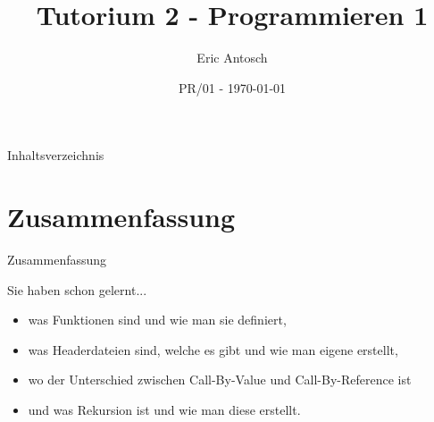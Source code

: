 \documentclass[usenames,dvipsnames,10pt]{beamer}
\title{Tutorium 2 - Programmieren 1}
\date[ISPN ’80]{PR/01 - \today}
\author{Eric Antosch}
\begin{document}
    
    \begin{frame}
        \titlepage
    \end{frame}    
    \begin{frame}{Inhaltsverzeichnis}
        \tableofcontents
    \end{frame}
    \section{Zusammenfassung}
    \begin{frame}{Zusammenfassung}
        \begin{block}{Sie haben schon gelernt...}
            \begin{itemize}
                \item was Funktionen sind und wie man sie definiert,
                \item was Headerdateien sind, welche es gibt und wie man eigene erstellt,
                \item wo der Unterschied zwischen Call-By-Value und Call-By-Reference ist
                \item und was Rekursion ist und wie man diese erstellt.
            \end{itemize}
        \end{block}
    \end{frame}
\end{document}
